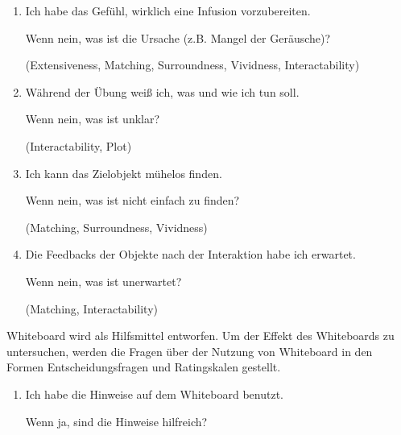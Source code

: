 \begin{enumerate}
    \item Ich habe das Gefühl, wirklich eine Infusion vorzubereiten.
    
    Wenn nein, was ist die Ursache (z.B. Mangel der Geräusche)?
    
    (Extensiveness, Matching, Surroundness, Vividness, Interactability)
    
    \item Während der Übung weiß ich, was und wie ich tun soll.
    
    Wenn nein, was ist unklar?
    
    (Interactability, Plot)
    
    \item Ich kann das Zielobjekt mühelos finden.
    
    Wenn nein, was ist nicht einfach zu finden?
    
    (Matching, Surroundness, Vividness)
    
%    
%    
    
    \item  Die Feedbacks der Objekte nach der Interaktion habe ich erwartet. 
    
    Wenn nein, was ist unerwartet?
    
    (Matching, Interactability)
    
%    
%    
    
\end{enumerate}

Whiteboard wird als Hilfsmittel entworfen. Um der Effekt des Whiteboards zu untersuchen, werden die Fragen über der Nutzung von Whiteboard in den Formen Entscheidungsfragen und Ratingskalen gestellt.

\begin{enumerate}
    \item Ich habe die Hinweise auf dem Whiteboard benutzt.
    
    Wenn ja, sind die Hinweise hilfreich?
\end{enumerate}

